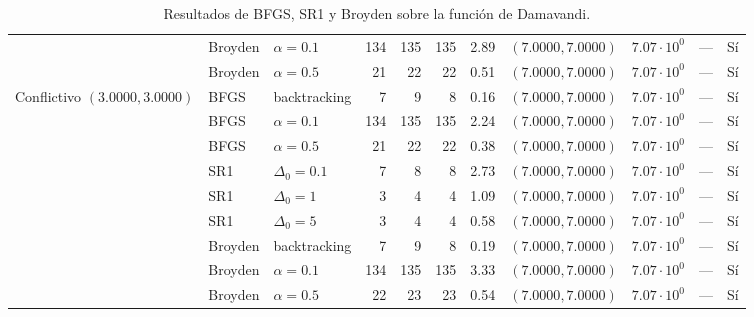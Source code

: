 \begin{table}[htbp]
{\begin{tabular}{lllrrrrlllc}
 & Broyden & $\alpha = 0.1$ & 134 & 135 & 135 & 2.89 & $(7.0000, 7.0000)$ & $7.07\cdot 10^{0}$ & --- & Sí \\
 & Broyden & $\alpha = 0.5$ & 21 & 22 & 22 & 0.51 & $(7.0000, 7.0000)$ & $7.07\cdot 10^{0}$ & --- & Sí \\
\midrule
Conflictivo $(3.0000, 3.0000)$ & BFGS & backtracking & 7 & 9 & 8 & 0.16 & $(7.0000, 7.0000)$ & $7.07\cdot 10^{0}$ & --- & Sí \\
 & BFGS & $\alpha = 0.1$ & 134 & 135 & 135 & 2.24 & $(7.0000, 7.0000)$ & $7.07\cdot 10^{0}$ & --- & Sí \\
 & BFGS & $\alpha = 0.5$ & 21 & 22 & 22 & 0.38 & $(7.0000, 7.0000)$ & $7.07\cdot 10^{0}$ & --- & Sí \\
 & SR1 & $\Delta_0 = 0.1$ & 7 & 8 & 8 & 2.73 & $(7.0000, 7.0000)$ & $7.07\cdot 10^{0}$ & --- & Sí \\
 & SR1 & $\Delta_0 = 1$ & 3 & 4 & 4 & 1.09 & $(7.0000, 7.0000)$ & $7.07\cdot 10^{0}$ & --- & Sí \\
 & SR1 & $\Delta_0 = 5$ & 3 & 4 & 4 & 0.58 & $(7.0000, 7.0000)$ & $7.07\cdot 10^{0}$ & --- & Sí \\
 & Broyden & backtracking & 7 & 9 & 8 & 0.19 & $(7.0000, 7.0000)$ & $7.07\cdot 10^{0}$ & --- & Sí \\
 & Broyden & $\alpha = 0.1$ & 134 & 135 & 135 & 3.33 & $(7.0000, 7.0000)$ & $7.07\cdot 10^{0}$ & --- & Sí \\
 & Broyden & $\alpha = 0.5$ & 22 & 23 & 23 & 0.54 & $(7.0000, 7.0000)$ & $7.07\cdot 10^{0}$ & --- & Sí \\
\bottomrule
\end{tabular}}
\caption{Resultados de BFGS, SR1 y Broyden sobre la función de Damavandi.}
\label{tab:f2}
\end{table}
